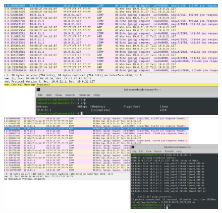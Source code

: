 \documentclass{article}
\begin{document}
 \begin{figure}[!htb]
    \begin{minipage}{0.49\textwidth}
      \centering
      \includegraphics[width=1\linewidth]{es4.2.1.png}
    \end{minipage}\hfill
    \begin{minipage}{0.49\textwidth}
      \centering
      \includegraphics[width=1\linewidth]{es4.2.2.png}
    \end{minipage}
 \end{figure}
\end{document}
